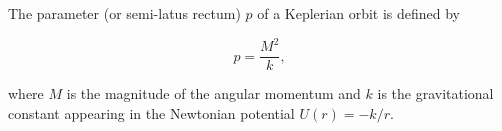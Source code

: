 The parameter (or semi-latus rectum) $p$ of a Keplerian orbit is defined by

$$p = \frac{M^2}{k},$$

where $M$ is the magnitude of the angular momentum and $k$ is the gravitational constant appearing in the Newtonian potential $U(r) = -k/r$.
